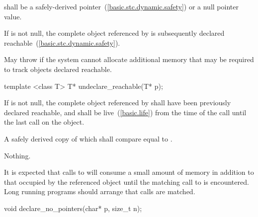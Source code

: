 \begin{itemdescr}
\pnum
\requires {} shall be a safely-derived
pointer~(\ref{basic.stc.dynamic.safety}) or a null pointer value.

\pnum
\effects If  is not null, the complete object referenced by 
is subsequently declared reachable~(\ref{basic.stc.dynamic.safety}).

\pnum
\throws May throw  if the system cannot allocate
additional memory that may be required to track objects declared reachable.
\end{itemdescr}

%
\begin{itemdecl}
template <class T> T* undeclare_reachable(T* p);
\end{itemdecl}

\begin{itemdescr}
\pnum
\requires If  is not null, the complete object referenced by 
shall have been previously declared reachable, and shall be
live~(\ref{basic.life}) from the time of the call until the last
 call on the object.

\pnum
\returns A safely derived copy of  which shall compare equal to .

\pnum
\throws Nothing.

\pnum \enternote It is expected that calls to  will consume
a small amount of memory in addition to that occupied by the referenced object until the
matching call to  is encountered. Long running programs
should arrange that calls are matched. \exitnote \end{itemdescr}

%
\begin{itemdecl}
void declare_no_pointers(char* p, size_t n);
\end{itemdecl}

